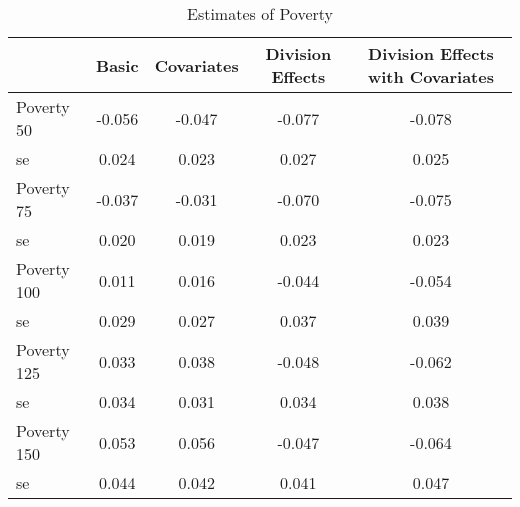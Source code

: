 \begin{table}[htbp]\centering
\caption{Estimates of Poverty}
\begin{tabular}{l*{4}{c}}
\toprule
            &       Basic&  Covariates&Division Effects&Division Effects with Covariates\\
\midrule
Poverty 50  &      -0.056&      -0.047&      -0.077&      -0.078\\
se          &       0.024&       0.023&       0.027&       0.025\\
Poverty 75  &      -0.037&      -0.031&      -0.070&      -0.075\\
se          &       0.020&       0.019&       0.023&       0.023\\
Poverty 100 &       0.011&       0.016&      -0.044&      -0.054\\
se          &       0.029&       0.027&       0.037&       0.039\\
Poverty 125 &       0.033&       0.038&      -0.048&      -0.062\\
se          &       0.034&       0.031&       0.034&       0.038\\
Poverty 150 &       0.053&       0.056&      -0.047&      -0.064\\
se          &       0.044&       0.042&       0.041&       0.047\\
\bottomrule
\end{tabular}
\end{table}
